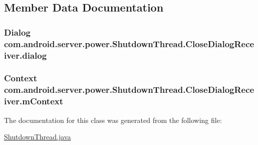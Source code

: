 \subsection{Member Data Documentation}
\hypertarget{classcom_1_1android_1_1server_1_1power_1_1ShutdownThread_1_1CloseDialogReceiver_a93b406c3e8b9976aa981ee369846f775}{
\subsubsection[{dialog}]{\setlength{\rightskip}{0pt plus 5cm}Dialog com.\-android.\-server.\-power.\-Shutdown\-Thread.\-Close\-Dialog\-Receiver.\-dialog}}\label{classcom_1_1android_1_1server_1_1power_1_1ShutdownThread_1_1CloseDialogReceiver_a93b406c3e8b9976aa981ee369846f775}
\hypertarget{classcom_1_1android_1_1server_1_1power_1_1ShutdownThread_1_1CloseDialogReceiver_a7f5161219feb6ce136795e9451047daf}{
\subsubsection[{m\-Context}]{\setlength{\rightskip}{0pt plus 5cm}Context com.\-android.\-server.\-power.\-Shutdown\-Thread.\-Close\-Dialog\-Receiver.\-m\-Context\hspace{0.3cm}{\ttfamily [private]}}}\label{classcom_1_1android_1_1server_1_1power_1_1ShutdownThread_1_1CloseDialogReceiver_a7f5161219feb6ce136795e9451047daf}


The documentation for this class was generated from the following file\-:\begin{DoxyCompactItemize}
\item 
\hyperlink{ShutdownThread_8java}{Shutdown\-Thread.\-java}\end{DoxyCompactItemize}
